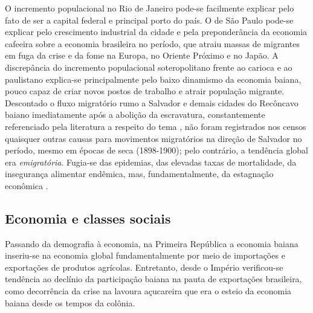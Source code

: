 O incremento populacional no Rio de Janeiro pode-se facilmente explicar pelo fato de ser a capital federal e principal porto do país. O de São Paulo pode-se explicar pelo crescimento industrial da cidade e pela preponderância da economia cafeeira sobre a economia brasileira no período, que atraiu massas de migrantes em fuga da crise e da fome na Europa, no Oriente Próximo e no Japão. A discrepância do incremento populacional soteropolitano frente ao carioca e ao paulistano explica-se principalmente pelo baixo dinamismo da economia baiana, pouco capaz de criar novos postos de trabalho e atrair população migrante. Descontado o fluxo migratório rumo a Salvador e demais cidades do Recôncavo baiano imediatamente após a abolição da escravatura, constantemente referenciado pela literatura a respeito do tema \cite{fraga_encruzilhadas_2014,souza_trabalholivre_2011}, não foram registrados nos censos quaisquer outras causas para movimentos migratórios na direção de Salvador no período, mesmo em épocas de seca (1898-1900); pelo contrário, a tendência global era \textit{emigratória}. Fugia-se das epidemias, das elevadas taxas de mortalidade, da insegurança alimentar endêmica, mas, fundamentalmente, da estagnação econômica \cite{santos_repovo_2001}.

\subsection{Economia e classes sociais}\label{subsubsec:ecobasa}

Passando da demografia à economia, na Primeira República a economia baiana inseriu-se na economia global fundamentalmente por meio de importações e exportações de produtos agrícolas. Entretanto, desde o Império verificou-se tendência ao declínio da participação baiana na pauta de exportações brasileira, como decorrência da crise na lavoura açucareira que era o esteio da economia baiana desde os tempos da colônia.

